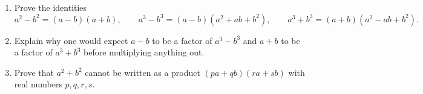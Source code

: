 \begin{enumerate}
\item[(a)] Prove the identities
\[
a^2-b^2=(a-b)(a+b),\qquad a^3-b^3=(a-b)(a^2+ab+b^2),\qquad a^3+b^3=(a+b)(a^2-ab+b^2).
\]
\item[(b)] Explain why one would expect $a-b$ to be a factor of $a^3-b^3$ and $a+b$ to be a factor of $a^3+b^3$ before multiplying anything out.
\item[(c)] Prove that $a^2+b^2$ cannot be written as a product $(pa+qb)(ra+sb)$ with real numbers $p,q,r,s$.
\end{enumerate}
